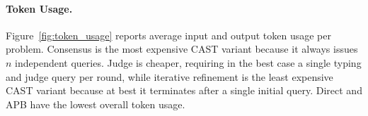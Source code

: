 \paragraph{Token Usage.}Figure~\ref{fig:token_usage} reports average input and output token usage per problem. Consensus is the most expensive CAST variant because it always issues $n$ independent queries. Judge is cheaper, requiring in the best case a single typing and judge query per round, while iterative refinement is the least expensive CAST variant because at best it terminates after a single initial query. Direct and APB have the lowest overall token usage.




\begin{table}[t]
\centering
\caption{Refusal accuracy on construction \textsc{no\_sub} problems. Model columns report the mean $\pm$ standard deviation across ten problems. \textsc{Cons} denotes consensus at $n=3$.}
\label{tab:refusal}
\footnotesize
\renewcommand{\arraystretch}{0.9}
\end{table}


